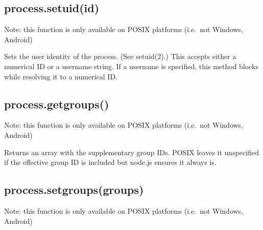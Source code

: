\subsection{process.setuid(id)}\label{process.setuidid}

Note: this function is only available on POSIX platforms (i.e.~not
Windows, Android)

Sets the user identity of the process. (See setuid(2).) This accepts
either a numerical ID or a username string. If a username is specified,
this method blocks while resolving it to a numerical ID.

\begin{Shaded}
\begin{Highlighting}[]
 \NormalTok{(} \NormalTok{&& }\NormalTok{) \{}
  \NormalTok{(} \NormalTok{+ }\NormalTok{());}
   \NormalTok{\{}
    \NormalTok{(}\NormalTok{);}
    \NormalTok{(} \NormalTok{+ }\NormalTok{());}
  \NormalTok{\}}
   
    \NormalTok{(} 
  \NormalTok{\}}
\NormalTok{\}}
\end{Highlighting}
\end{Shaded}

\subsection{process.getgroups()}\label{process.getgroups}

Note: this function is only available on POSIX platforms (i.e.~not
Windows, Android)

Returns an array with the supplementary group IDs. POSIX leaves it
unspecified if the effective group ID is included but node.js ensures it
always is.

\subsection{process.setgroups(groups)}\label{process.setgroupsgroups}

Note: this function is only available on POSIX platforms (i.e.~not
Windows, Android)

